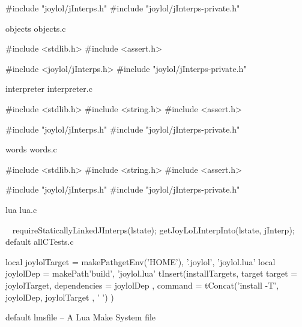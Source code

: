 #include "joylol/jInterps.h"
#include "joylol/jInterps-private.h"
\stopCCode

\createCCodeFile%
  {objects}%
  {objects.c}%
  {}

\startCCode
#include <stdlib.h>
#include <assert.h>

#include <joylol/jInterps.h>
#include "joylol/jInterps-private.h"
\stopCCode

\createCCodeFile%
  {interpreter}%
  {interpreter.c}%
  {}

\startCCode
#include <stdlib.h>
#include <string.h>
#include <assert.h>

#include "joylol/jInterps.h"
#include "joylol/jInterps-private.h"
\stopCCode

\createCCodeFile%
  {words}%
  {words.c}%
  {}

\startCCode
#include <stdlib.h>
#include <string.h>
#include <assert.h>

#include "joylol/jInterps.h"
#include "joylol/jInterps-private.h"
\stopCCode

\createCCodeFile%
  {lua}%
  {lua.c}%
  {}

\CTestsSetup\
\startCTest
  requireStaticallyLinkedJInterps(lstate);
  getJoyLoLInterpInto(lstate, jInterp);
\stopCTest
\createCTestFile%
  {default}%
  {allCTests.c}%
  {}


\startLmsfile
local joylolTarget = makePath{getEnv('HOME'), '.joylol', 'joylol.lua'}
local joylolDep    = makePath{'build', 'joylol.lua'}
tInsert(installTargets, target{
  target       = joylolTarget,
  dependencies = { joylolDep },
  command      = tConcat({'install -T', joylolDep, joylolTarget }, ' ')
})
\stopLmsfile




\createLmsfileFile%
  {default}%
  {lmsfile}%
  {-- A Lua Make System file}

